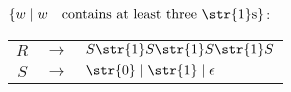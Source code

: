 $\{w \mid w \quad \text{contains at least three \str{1}s}\}$: \par
\begin{tabular}{ccl}
	$R$ & $\rightarrow$ & $S\str{1}S\str{1}S\str{1}S$ \\
	$S$ & $\rightarrow$ & $\str{0} \mid \str{1} \mid \epsilon$ \\
\end{tabular}